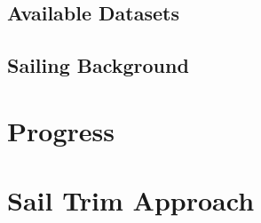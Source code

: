\documentclass[12pt,twoside]{report}
\begin{document}
\section{Available Datasets}

\section{Sailing Background}

\chapter{Progress}

\appendix
{}
\chapter{Sail Trim Approach}

\end{document}
